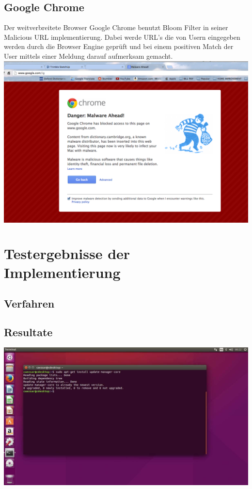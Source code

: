 \documentclass[12pt,a4paper]{report}
\begin{document}
\section{Google Chrome}\label{sec:google-chrome}
Der weitverbreitete Browser Google Chrome benutzt Bloom Filter in seiner Malicious URL implementierung. Dabei werde URL's die von Usern eingegeben werden durch die Browser Engine geprüft und bei einem positiven Match der User mittels einer Meldung darauf aufmerksam gemacht.
\includegraphics{assets/google_malware.png}

\chapter{Testergebnisse der Implementierung}\label{ch:testergebnisse-der-implementierung}
\section{Verfahren}\label{sec:verfahren}
\section{Resultate}\label{sec:resultate}
\includegraphics[width=\textwidth]{assets/results.jpg}
\end{document}
